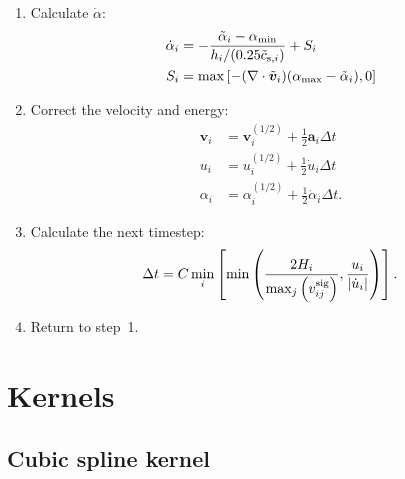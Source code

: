 \documentclass[fleqn,dvipdfmx]{article}
\begin{document}
\begin{enumerate}
\item Calculate $\dot{\alpha}$:
  \begin{align}
    \dot{\alpha}_i &= - \frac{\tilde{\alpha}_i - \alpha_{\rm
        min}}{h_i/(0.25\tilde{c}_{{\rm s},i})} + S_i \\ 
    S_i &= \max \left[ -(\nabla \cdot \tilde{\bm{v}}_i)(\alpha_{\rm
        max}-\tilde{\alpha}_i), 0 \right]
  \end{align}

\item Correct the velocity and energy:
  \begin{align}
    \bm{v}_i &= \bm{v}^{(1/2)}_i + \frac{1}{2} \bm{a}_i \Delta t \\
    u_i &= u^{(1/2)}_i + \frac{1}{2} \dot{u}_i \Delta t \\
    \alpha_i &= \alpha^{(1/2)}_i + \frac{1}{2} \dot{\alpha}_i \Delta
    t.
  \end{align}

\item Calculate the next timestep:
  \begin{align}
    \Delta t = C \min_i \left[ \min \left( \frac{2H_i}{\max_j \left(
        v_{ij}^{\rm sig} \right) }, \frac{u_i}{|\dot{u}_i|} \right)
      \right].
  \end{align}

\item Return to step~1.
\end{enumerate}

\appendix

\section{Kernels}
\label{sec:kernels}

\subsection{Cubic spline kernel}
\end{document}
